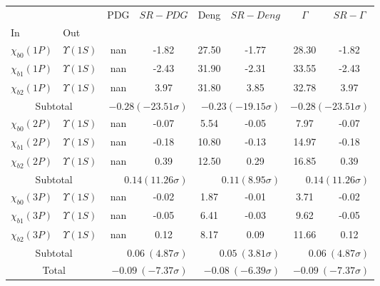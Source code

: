 \begin{tabular}{|l|l|c|c|c|c|c|c|}%
\hline%
&&PDG&$SR-PDG$&Deng&$SR-Deng$&$\Gamma$&$SR-\Gamma$\\%
In&Out&&&&&&\\%
\hline%
$\chi_{b0}(1P)$&$\Upsilon(1S)$&nan&-1.82&27.50&-1.77&28.30&-1.82\\%
$\chi_{b1}(1P)$&$\Upsilon(1S)$&nan&-2.43&31.90&-2.31&33.55&-2.43\\%
$\chi_{b2}(1P)$&$\Upsilon(1S)$&nan&3.97&31.80&3.85&32.78&3.97\\%
\hline%
\hline%
\multicolumn{2}{|c|}{Subtotal}&\multicolumn{2}{|r|}{$-0.28 (-23.51\sigma)$}&\multicolumn{2}{|r|}{$-0.23 (-19.15\sigma)$}&\multicolumn{2}{|r|}{$-0.28 (-23.51\sigma)$}\\%
\hline%
\hline%
$\chi_{b0}(2P)$&$\Upsilon(1S)$&nan&-0.07&5.54&-0.05&7.97&-0.07\\%
$\chi_{b1}(2P)$&$\Upsilon(1S)$&nan&-0.18&10.80&-0.13&14.97&-0.18\\%
$\chi_{b2}(2P)$&$\Upsilon(1S)$&nan&0.39&12.50&0.29&16.85&0.39\\%
\hline%
\hline%
\multicolumn{2}{|c|}{Subtotal}&\multicolumn{2}{|r|}{$0.14 (11.26\sigma)$}&\multicolumn{2}{|r|}{$0.11 (8.95\sigma)$}&\multicolumn{2}{|r|}{$0.14 (11.26\sigma)$}\\%
\hline%
\hline%
$\chi_{b0}(3P)$&$\Upsilon(1S)$&nan&-0.02&1.87&-0.01&3.71&-0.02\\%
$\chi_{b1}(3P)$&$\Upsilon(1S)$&nan&-0.05&6.41&-0.03&9.62&-0.05\\%
$\chi_{b2}(3P)$&$\Upsilon(1S)$&nan&0.12&8.17&0.09&11.66&0.12\\%
\hline%
\hline%
\multicolumn{2}{|c|}{Subtotal}&\multicolumn{2}{|r|}{$0.06~(4.87\sigma)$}&\multicolumn{2}{|r|}{$0.05~(3.81\sigma)$}&\multicolumn{2}{|r|}{$0.06~(4.87\sigma)$}\\%
\hline%
\hline%
\multicolumn{2}{|c|}{Total}&\multicolumn{2}{|r|}{$-0.09~(-7.37\sigma)$}&\multicolumn{2}{|r|}{$-0.08~(-6.39\sigma)$}&\multicolumn{2}{|r|}{$-0.09~(-7.37\sigma)$}\\%
\hline%
\end{tabular}